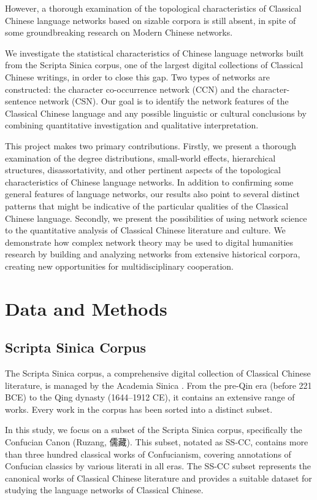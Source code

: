 \documentclass[11pt]{article}
\begin{document}
However, a thorough examination of the topological characteristics of Classical Chinese language networks based on sizable corpora is still absent, in spite of some groundbreaking research on Modern Chinese networks\cite{LI2007629}.

We investigate the statistical characteristics of Chinese language networks built from the Scripta Sinica corpus, one of the largest digital collections of Classical Chinese writings, in order to close this gap. Two types of networks are constructed: the character co-occurrence network (CCN) and the character-sentence network (CSN). Our goal is to identify the network features of the Classical Chinese language and any possible linguistic or cultural conclusions by combining quantitative investigation and qualitative interpretation.

This project makes two primary contributions. Firstly, we present a thorough examination of the degree distributions, small-world effects, hierarchical structures, disassortativity, and other pertinent aspects of the topological characteristics of Chinese language networks. In addition to confirming some general features of language networks, our results also point to several distinct patterns that might be indicative of the particular qualities of the Classical Chinese language. Secondly, we present the possibilities of using network science to the quantitative analysis of Classical Chinese literature and culture. We demonstrate how complex network theory may be used to digital humanities research by building and analyzing networks from extensive historical corpora, creating new opportunities for multidisciplinary cooperation.

\section{Data and Methods}

\subsection{Scripta Sinica Corpus}
The Scripta Sinica corpus, a comprehensive digital collection of Classical Chinese literature, is managed by the Academia Sinica \cite{ScriptaSinica}. From the pre-Qin era (before 221 BCE) to the Qing dynasty (1644–1912 CE), it contains an extensive range of works. Every work in the corpus has been sorted into a distinct subset.

In this study, we focus on a subset of the Scripta Sinica corpus,  specifically the Confucian Canon (Ruzang, 儒藏). This subset, notated as SS-CC, contains more than three hundred classical works of Confucianism, covering annotations of Confucian classics by various literati in all eras. The SS-CC subset represents the canonical works of Classical Chinese literature and provides a suitable dataset for studying the language networks of Classical Chinese.
\end{document}
